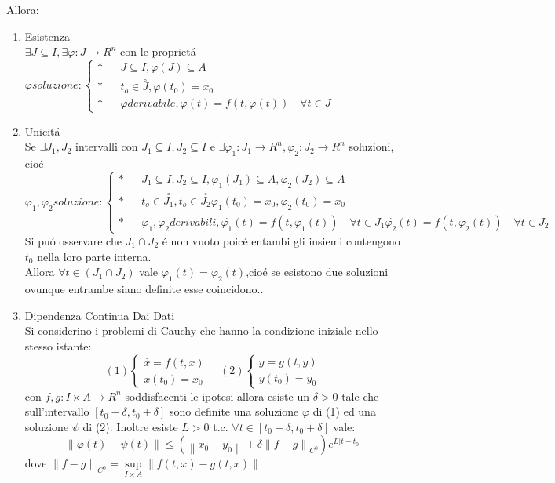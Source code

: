 Allora:
\begin{enumerate}
	\item Esistenza\\
	$\exists J\subseteq I, \exists\varphi : J \to R^n$ con le propriet\'a\\
	$\varphi soluzione:
	\left\{
	\begin{matrix}
	\ast && J\subseteq I, \varphi(J)\subseteq{A}\\
	\ast && t_o\in\overset{\circ}{J}, \varphi(t_0)=x_0\\
	\ast && \varphi derivabile, \overset{\cdot}{\varphi}(t)=f(t,\varphi(t)) \quad\forall t\in J\end{matrix}\right.$
	\item Unicit\'a\\
	Se $\exists J_1,J_2$ intervalli con $J_1\subseteq I,J_2\subseteq I$ e $\exists \varphi_1:J_1\to R^n, \varphi_2:J_2\to R^n$ soluzioni, cio\'e\\
	$\varphi_1,\varphi_2 soluzione:
	\left\{
	\begin{matrix}
	\ast && J_1\subseteq I,J_2\subseteq I, \varphi_1(J_1)\subseteq{A},\varphi_2(J_2)\subseteq{A}\\
	\ast && t_o\in\overset{\circ}{J_1},t_o\in\overset{\circ}{J_2} \varphi_1(t_0)=x_0, \varphi_2(t_0)=x_0\\
	\ast && \varphi_1,\varphi_2 derivabili, \overset{\cdot}{\varphi_1}(t)=f(t,\varphi_1(t)) \quad\forall t\in J_1
	\overset{\cdot}{\varphi_2}(t)=f(t,\varphi_2(t)) \quad\forall t\in J_2
	\end{matrix}\right.$
	Si pu\'o osservare che $J_1\cap J_2$ \'e non vuoto poic\'e entambi gli insiemi contengono $t_0$ nella loro parte interna.\\
	Allora $\forall t \in(J_1\cap J_2)$ vale $\varphi_1(t)=\varphi_2(t)$,cio\'e se esistono due soluzioni ovunque entrambe siano definite esse coincidono..\\
	\item Dipendenza Continua Dai Dati\\
	Si considerino i problemi di Cauchy che hanno la condizione iniziale nello stesso istante:
	$$ 
	(1)\left\{
	\begin{matrix}
	\overset{\cdot}{x}=f(t,x)\\x(t_0)=x_0
	\end{matrix}
	\right.\quad
	(2)\left\{
	\begin{matrix}
	\overset{\cdot}{y}=g(t,y)\\y(t_0)=y_0
	\end{matrix}
	\right.
	$$
	con $f,g:I\times A \to R^n$ soddisfacenti le ipotesi allora esiste un $\delta >0$ tale che sull'intervallo $\left[ t_0-\delta,t_0+\delta \right]$ sono definite una soluzione $\varphi$ di (1) ed una soluzione $\psi$ di (2). Inoltre esiste $L>0$ t.c. $\forall t\in \left[t_0-\delta,t_0+\delta\right]$ vale:
	$$ 
	\left\| \varphi(t)-\psi(t) \right\| 
	\le 
	(\left\| x_0-y_0 \right\|+\delta\left\| f-g \right\|_{C^0})e^{L|t-t_0|}  
	$$
	dove $\left\| f-g \right\|_{C^0}=\sup\limits_{I\times A}\left\|f(t,x)-g(t,x)\right\|$
\end{enumerate}
